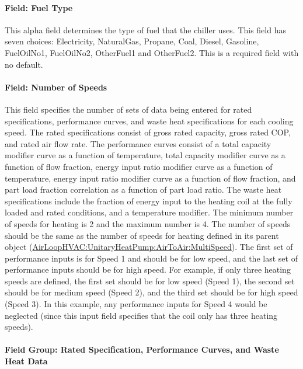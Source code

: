 \paragraph{Field: Fuel Type}\label{field-fuel-type-1-000}

This alpha field determines the type of fuel that the chiller uses. This field has seven choices: Electricity, NaturalGas, Propane, Coal, Diesel, Gasoline, FuelOilNo1, FuelOilNo2, OtherFuel1 and OtherFuel2. This is a required field with no default.

\paragraph{Field: Number of Speeds}\label{field-number-of-speeds-2}

This field specifies the number of sets of data being entered for rated specifications, performance curves, and waste heat specifications for each cooling speed. The rated specifications consist of gross rated capacity, gross rated COP, and rated air flow rate. The performance curves consist of a total capacity modifier curve as a function of temperature, total capacity modifier curve as a function of flow fraction, energy input ratio modifier curve as a function of temperature, energy input ratio modifier curve as a function of flow fraction, and part load fraction correlation as a function of part load ratio. The waste heat specifications include the fraction of energy input to the heating coil at the fully loaded and rated conditions, and a temperature modifier. The minimum number of speeds for heating is 2 and the maximum number is 4. The number of speeds should be the same as the number of speeds for heating defined in its parent object (\hyperref[airloophvacunitaryheatpumpairtoairmultispeed]{AirLoopHVAC:UnitaryHeatPump:AirToAir:MultiSpeed}). The first set of performance inputs is for Speed 1 and should be for low speed, and the last set of performance inputs should be for high speed. For example, if only three heating speeds are defined, the first set should be for low speed (Speed 1), the second set should be for medium speed (Speed 2), and the third set should be for high speed (Speed 3). In this example, any performance inputs for Speed 4 would be neglected (since this input field specifies that the coil only has three heating speeds).

\paragraph{Field Group: Rated Specification, Performance Curves, and Waste Heat Data}\label{field-group-rated-specification-performance-curves-and-waste-heat-data}

